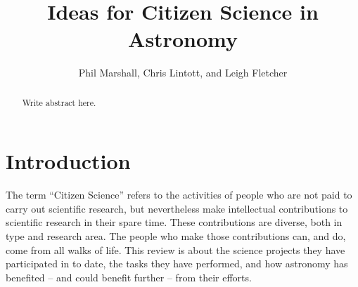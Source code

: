 \documentclass{ar2e}
\begin{document}

\jvol{}
\ARinfo{}

\title{Ideas for Citizen Science in Astronomy}

\author{Phil Marshall,
Chris Lintott, and
Leigh Fletcher
}




\begin{abstract}
Write abstract here.
\end{abstract}

\maketitle


\section{Introduction}
\label{sec:intro}

The term ``Citizen Science'' refers to the activities of people who are not paid
to carry out scientific research, but nevertheless make intellectual
contributions to scientific research in their spare time. These contributions
are diverse, both in type and research area. The people who make those
contributions can, and do, come from all walks of life. This review is about the
science projects they have participated in to date, the tasks they have
performed, and how astronomy has benefited -- and could benefit further -- from
their efforts.
\end{document}
